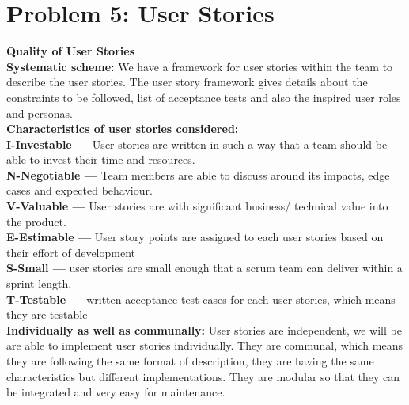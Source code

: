 \documentclass[a4paper,12pt]{report}
\begin{document}
\vspace{1cm}
\section{Problem 5: User Stories}


\textbf{Quality of User Stories} \\

\textbf{Systematic scheme:} We have a framework for user stories within the team to describe the user stories. The user story framework gives details about the constraints to be followed, list of acceptance tests and also the inspired user roles and personas.\\


\textbf{Characteristics of user stories considered:} \\ 
\textbf{I-Investable —} User stories are written in such a way that a team should be able to invest their time and resources. \\
\textbf{N-Negotiable —} Team members are able to discuss around its impacts, edge cases and expected behaviour. \\
\textbf{V-Valuable —} User stories are with significant business/ technical value into the product. \\
\textbf{E-Estimable —} User story points are assigned to each user stories based on their effort of development \\
\textbf{S-Small —} user stories are small enough that a scrum team can deliver within a sprint length. \\
\textbf{T-Testable —} written acceptance test cases for each user stories, which means they are testable \\


\textbf{Individually as well as communally:} User stories are independent, we will be are able to implement user stories individually. They are communal, which means they are following the same format of description, they are having the same characteristics but different implementations. They are modular so that they can be integrated and very easy for maintenance.







\setlength\arrayrulewidth{2pt}
\FloatBarrier


\end{document}
